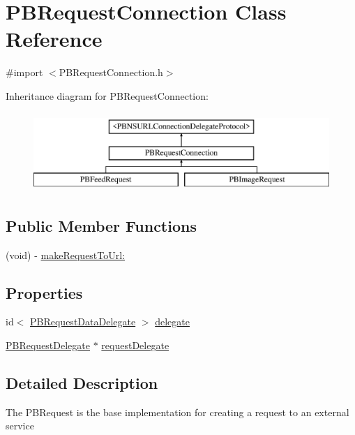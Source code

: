 \hypertarget{interface_p_b_request_connection}{
\section{PBRequestConnection Class Reference}
\label{interface_p_b_request_connection}
}


{\ttfamily \#import $<$PBRequestConnection.h$>$}

Inheritance diagram for PBRequestConnection:\begin{figure}[H]
\begin{center}
\leavevmode
\includegraphics[height=3cm]{interface_p_b_request_connection}
\end{center}
\end{figure}
\subsection*{Public Member Functions}
\begin{DoxyCompactItemize}
\item 
(void) -\/ \hyperlink{interface_p_b_request_connection_a014d10ea50c7d8df727f710a681eae30}{makeRequestToUrl:}
\end{DoxyCompactItemize}
\subsection*{Properties}
\begin{DoxyCompactItemize}
\item 
id$<$ \hyperlink{protocol_p_b_request_data_delegate-p}{PBRequestDataDelegate} $>$ \hyperlink{interface_p_b_request_connection_a79f0873c9262a2cbdd23119b13608a51}{delegate}
\item 
\hyperlink{interface_p_b_request_delegate}{PBRequestDelegate} $\ast$ \hyperlink{interface_p_b_request_connection_a65d23493156958db1aabd045604095b6}{requestDelegate}
\end{DoxyCompactItemize}


\subsection{Detailed Description}
The PBRequest is the base implementation for creating a request to an external service 

